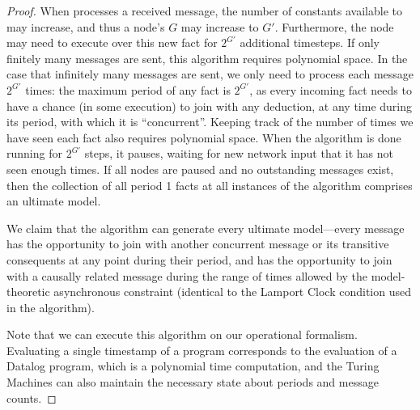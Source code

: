 \begin{proof}
When  processes a received message, the number of constants available to  may increase, and thus a node's $G$ may increase to $G'$.  Furthermore, the node may need to execute over this new fact for $2^{G'}$ additional timesteps.  If only finitely many messages are sent, this algorithm requires polynomial space.  In the case that infinitely many messages are sent, we only need to process each message $2^{G'}$ times: the maximum period of any fact is $2^{G'}$, as every incoming fact needs to have a chance (in some execution) to join with any deduction, at any time during its period, with which it is ``concurrent''.  Keeping track of the number of times we have seen each fact also requires polynomial space.  When the algorithm is done running for $2^{G'}$ steps, it pauses, waiting for new network input that it has not seen enough times.  If all nodes are paused and no outstanding messages exist, then the collection of all period 1 facts at all instances of the algorithm comprises an ultimate model.

We claim that the algorithm can generate every ultimate model---every message has the opportunity to join with another concurrent message or its transitive consequents at any point during their period, and has the opportunity to join with a causally related message during the range of times allowed by the model-theoretic asynchronous constraint (identical to the Lamport Clock condition used in the algorithm).

Note that we can execute this algorithm on our operational formalism.  Evaluating a single timestamp of a \lang program corresponds to the evaluation of a Datalog program, which is a polynomial time computation, and the Turing Machines can also maintain the necessary state about periods and message counts.
\end{proof}

